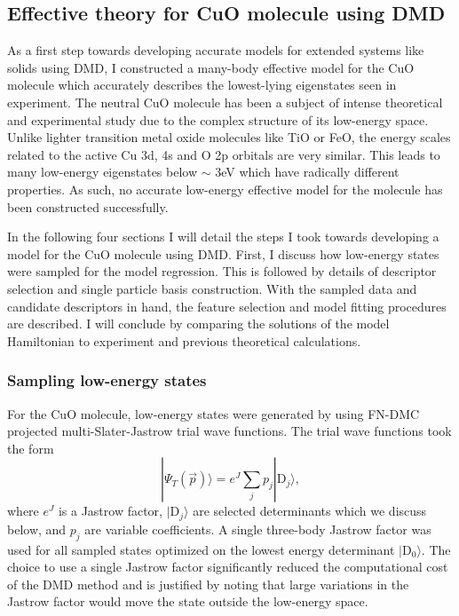 \documentclass[12pt]{article}
\begin{document}
\subsection{Effective theory for CuO molecule using DMD}
As a first step towards developing accurate models for extended systems like solids using DMD, I constructed a many-body effective model for the CuO molecule which accurately describes the lowest-lying eigenstates seen in experiment.
The neutral CuO molecule has been a subject of intense theoretical and experimental study due to the complex structure of its low-energy space.
Unlike lighter transition metal oxide molecules like TiO or FeO, the energy scales related to the active Cu 3d, 4s and O 2p orbitals are very similar.
This leads to many low-energy eigenstates below $\sim $ 3eV which have radically different properties.
As such, no accurate low-energy effective model for the molecule has been constructed successfully.

In the following four sections I will detail the steps I took towards developing a model for the CuO molecule using DMD.
First, I discuss how low-energy states were sampled for the model regression.
This is followed by details of descriptor selection and single particle basis construction.
With the sampled data and candidate descriptors in hand, the feature selection and model fitting procedures are described.
I will conclude by comparing the solutions of the model Hamiltonian to experiment and previous theoretical calculations.

\subsubsection{Sampling low-energy states}
For the CuO molecule, low-energy states were generated by using FN-DMC projected multi-Slater-Jastrow trial wave functions.
The trial wave functions took the form
\begin{equation}
|\Psi_T(\vec{p}) \rangle =  e^{J}\sum_{j} p_j|\text{D}_j\rangle,
\label{eq:sampling}
\end{equation}
where $e^J$ is a Jastrow factor, $|\text{D}_j\rangle$ are selected determinants which we discuss below, and $p_j$ are variable coefficients.
A single three-body Jastrow factor was used for all sampled states optimized on the lowest energy determinant $|\text{D}_0 \rangle$.
The choice to use a single Jastrow factor significantly reduced the computational cost of the DMD method and is justified by noting that large variations in the Jastrow factor would move the state outside the low-energy space.
\end{document}

